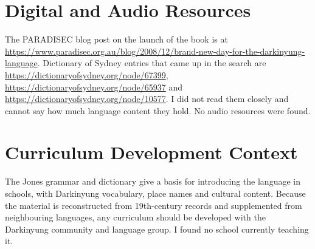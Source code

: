 \documentclass[12pt]{article}
\begin{document}
\section{Digital and Audio Resources}
The PARADISEC blog post on the launch of the book is at \url{https://www.paradisec.org.au/blog/2008/12/brand-new-day-for-the-darkinyung-language}. Dictionary of Sydney entries that came up in the search are \url{https://dictionaryofsydney.org/node/67399}, \url{https://dictionaryofsydney.org/node/65937} and \url{https://dictionaryofsydney.org/node/10577}. I did not read them closely and cannot say how much language content they hold. No audio resources were found.

\section{Curriculum Development Context}
The Jones grammar and dictionary give a basis for introducing the language in schools, with Darkinyung vocabulary, place names and cultural content. Because the material is reconstructed from 19th-century records and supplemented from neighbouring languages, any curriculum should be developed with the Darkinyung community and language group. I found no school currently teaching it.
\end{document}
